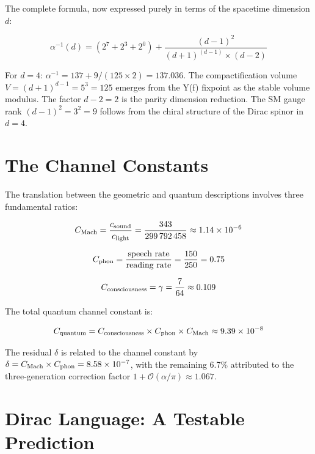 \documentclass[12pt,a4paper]{article}
\begin{document}
The complete formula, now expressed purely in terms of the spacetime dimension $d$:

\begin{equation}\label{eq:alpha_complete}
\alpha^{-1}(d) = (2^7 + 2^3 + 2^0) + \frac{(d-1)^2}{(d+1)^{(d-1)} \times (d-2)}
\end{equation}

For $d=4$: $\alpha^{-1} = 137 + 9/(125 \times 2) = 137.036$. The compactification volume $V = (d+1)^{d-1} = 5^3 = 125$ emerges from the Y(f) fixpoint as the stable volume modulus. The factor $d-2 = 2$ is the parity dimension reduction. The SM gauge rank $(d-1)^2 = 3^2 = 9$ follows from the chiral structure of the Dirac spinor in $d=4$.

\section{The Channel Constants}

The translation between the geometric and quantum descriptions involves three fundamental ratios:

\begin{equation}\label{eq:channel}
C_{\rm Mach} = \frac{c_{\rm sound}}{c_{\rm light}} = \frac{343}{299\,792\,458} \approx 1.14 \times 10^{-6}
\end{equation}

\begin{equation}\label{eq:phon}
C_{\rm phon} = \frac{\text{speech rate}}{\text{reading rate}} = \frac{150}{250} = 0.75
\end{equation}

\begin{equation}\label{eq:cons}
C_{\rm consciousness} = \gamma = \frac{7}{64} \approx 0.109
\end{equation}

The total quantum channel constant is:

\begin{equation}\label{eq:total}
C_{\rm quantum} = C_{\rm consciousness} \times C_{\rm phon} \times C_{\rm Mach} \approx 9.39 \times 10^{-8}
\end{equation}

The residual $\delta$ is related to the channel constant by $\delta = C_{\rm Mach} \times C_{\rm phon} = 8.58 \times 10^{-7}$, with the remaining 6.7\% attributed to the three-generation correction factor $1 + \mathcal{O}(\alpha/\pi) \approx 1.067$.

\section{Dirac Language: A Testable Prediction}
\end{document}
